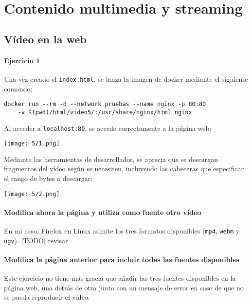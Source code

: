 \chapter{Contenido multimedia y streaming}\label{chap:5}
\section{Vídeo en la web}
\subsubsection{Ejercicio 1}
Una vez creado el \Verb#index.html#, se lanza la imagen de docker mediante el
siguiente comando:
\begin{verbatim}
docker run --rm -d --network pruebas --name nginx -p 80:80
    -v $(pwd)/html/video5/:/usr/share/nginx/html nginx
\end{verbatim}

Al acceder a \Verb#localhost:80#, se accede correctamente a la página web: \\
\begin{minipage}{\linewidth}
	\centering
	\texttt{[image: 5/1.png]}
	\label{fig:5/1}
\end{minipage}

Mediante las herramientas de desarrollador, se aprecia que se descargan fragmentos del vídeo
según se necesiten, incluyendo las cabeceras que especifican el rango de bytes a descargar: \\
\begin{minipage}{\linewidth}
	\centering
	\texttt{[image: 5/2.png]}
	\label{fig:5/2}
\end{minipage}

\subsubsection{Modifica ahora la página y utiliza como fuente otro vídeo}
En mi caso, Firefox en Linux admite los tres formatos disponibles (\Verb#mp4#, \Verb#webm# y \Verb#ogv#).
|TODO| revisar

\subsubsection{Modifica la página anterior para incluir todas las fuentes disponibles}
Este ejercicio no tiene más gracia que añadir las tres fuentes disponibles en la página web,
una detrás de otra junto con un mensaje de error en caso de que no se pueda reproducir el vídeo.

